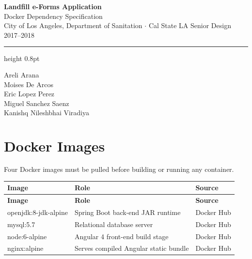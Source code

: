 \documentclass[12pt,letterpaper]{article}
\begin{document}
\begin{center}
  {\Huge\bfseries\color{headerblue} Landfill e-Forms Application}\\[0.5em]
  {\Large\color{subblue} Docker Dependency Specification}\\[0.8em]
  {\small\color{muted}
    City of Los Angeles, Department of Sanitation
    \enspace$\cdot$\enspace
    Cal State LA Senior Design 2017--2018}
\end{center}

\vspace{1em}
\hrule height 0.8pt
\vspace{1.5em}
\begin{center}
{
Areli Arana \\
Moises De Arcos \\
Eric Lopez Perez \\
Miguel Sanchez Saenz \\
Kanishq Nileshbhai Viradiya
}
\end{center}



\section{Docker Images}

Four Docker images must be pulled before building or running any container.

\vspace{0.5em}
\begin{longtable}{>{\ttfamily}p{4.2cm} p{5.8cm} p{3.2cm}}
  \rowcolor{headerblue}
  \color{white}\textbf{Image} &
  \color{white}\textbf{Role} &
  \color{white}\textbf{Source} \\
  \endfirsthead
  \rowcolor{headerblue}
  \color{white}\textbf{Image} &
  \color{white}\textbf{Role} &
  \color{white}\textbf{Source} \\
  \endhead
  openjdk:8-jdk-alpine  & Spring Boot back-end JAR runtime          & Docker Hub \\
  \rowcolor{rowshade}
  mysql:5.7             & Relational database server                 & Docker Hub \\
  node:6-alpine         & Angular 4 front-end build stage            & Docker Hub \\
  \rowcolor{rowshade}
  nginx:alpine          & Serves compiled Angular static bundle      & Docker Hub \\
\end{longtable}
\end{document}
